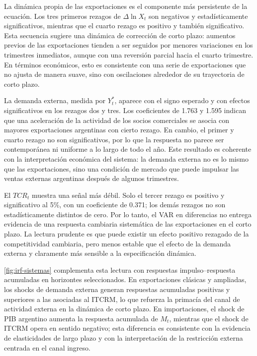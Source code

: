 \documentclass[11pt,a4paper]{article}
\begin{document}
	La dinámica propia de las exportaciones es el componente más persistente de la
	ecuación. Los tres primeros rezagos de \(\Delta \ln X_t\) son negativos y
	estadísticamente significativos, mientras que el cuarto rezago es positivo y
	también significativo. Esta secuencia sugiere una dinámica de corrección de
	corto plazo: aumentos previos de las exportaciones tienden a ser seguidos por
	menores variaciones en los trimestres inmediatos, aunque con una reversión
	parcial hacia el cuarto trimestre. En términos económicos, esto es consistente
	con una serie de exportaciones que no ajusta de manera suave, sino con
	oscilaciones alrededor de su trayectoria de corto plazo.
	
	La demanda externa, medida por \(Y_t^*\), aparece con el signo esperado y con
	efectos significativos en los rezagos dos y tres. Los coeficientes de 1.763 y
	1.595 indican que una aceleración de la actividad de los socios comerciales se
	asocia con mayores exportaciones argentinas con cierto rezago. En cambio, el
	primer y cuarto rezago no son significativos, por lo que la respuesta no parece
	ser contemporánea ni uniforme a lo largo de todo el año. Este resultado es
	coherente con la interpretación económica del sistema: la demanda externa no es
	lo mismo que las exportaciones, sino una condición de mercado que puede impulsar
	las ventas externas argentinas después de algunos trimestres.
	
	El \(TCR_t\) muestra una señal más débil. Solo el tercer rezago es positivo y
	significativo al 5\%, con un coeficiente de 0.371; los demás rezagos no son
	estadísticamente distintos de cero. Por lo tanto, el VAR en diferencias no
	entrega evidencia de una respuesta cambiaria sistemática de las exportaciones
	en el corto plazo. La lectura prudente es que puede existir un efecto positivo
	rezagado de la competitividad cambiaria, pero menos estable que el efecto de la
	demanda externa y claramente más sensible a la especificación dinámica.

	\autoref{fig:irf-sistemas} complementa esta lectura con respuestas
	impulso--respuesta acumuladas en horizontes seleccionados. En exportaciones
	clásicas y ampliadas, los shocks de demanda externa generan respuestas
	acumuladas positivas y superiores a las asociadas al ITCRM, lo que refuerza la
	primacía del canal de actividad externa en la dinámica de corto plazo. En
	importaciones, el shock de PIB argentino aumenta la respuesta acumulada de
	\(M_t\), mientras que el shock de ITCRM opera en sentido negativo; esta
	diferencia es consistente con la evidencia de elasticidades de largo plazo y
	con la interpretación de la restricción externa centrada en el canal ingreso.
\end{document}
